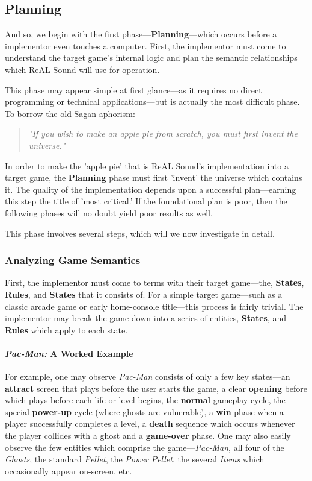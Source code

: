 \documentclass{report}
\newcommand{\rs}{ReAL Sound\xspace}
\newcommand{\plan}{\textbf{Planning}\xspace}
\newcommand{\state}[1]{\textbf{#1}}
\newcommand{\rules}{\textbf{Rules}\xspace}
\newcommand{\imp}{implementor\xspace}
\begin{document}
\subsection{Planning}

And so, we begin with the first phase---\plan---which occurs before a implementor even touches a computer. First, the \imp must come to understand the target game's internal logic and plan the semantic relationships which \rs will use for operation.

This phase may appear simple at first glance---as it requires no direct programming or technical applications---but is actually the most difficult phase. To borrow the old Sagan aphorism:

\begin{quote}
    
\emph{"If you wish to make an apple pie from scratch, you must first invent the universe."}
    
\end{quote}

In order to make the 'apple pie' that is \rs's implementation into a target game, the \plan phase must first 'invent' the universe which contains it. The quality of the implementation depends upon a successful plan---earning this step the title of 'most critical.' If the foundational plan is poor, then the following phases will no doubt yield poor results as well. 

This phase involves several steps, which will we now investigate in detail.

\subsubsection{Analyzing Game Semantics}

First, the \imp must come to terms with their target game---the, \state{States}, \rules, and \state{States} that it consists of. For a simple target game---such as a classic arcade game or early home-console title---this process is fairly trivial. The \imp may break the game down into a series of entities, \state{States}, and \rules which apply to each state.

\paragraph{\emph{Pac-Man:} A Worked Example }

For example, one may observe \emph{Pac-Man} consists of only a few key states---an \state{attract} screen that plays before the user starts the game, a clear \state{opening} before which plays before each life or level begins, the \state{normal} gameplay cycle, the special \state{power-up} cycle (where ghosts are vulnerable), a \state{win} phase when a player successfully completes a level, a \state{death} sequence which occurs whenever the player collides with a ghost and a \state{game-over} phase. One may also easily observe the few entities which comprise the game---\emph{Pac-Man}, all four of the \emph{Ghosts}, the standard \emph{Pellet}, the \emph{Power Pellet}, the several \emph{Items} which occasionally appear on-screen, etc.
\end{document}
